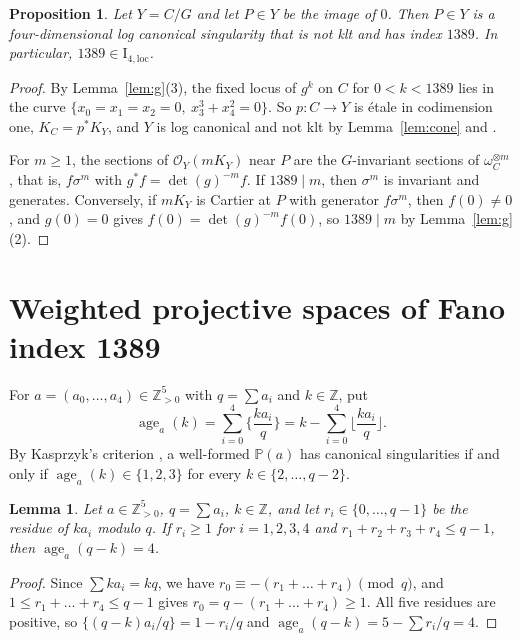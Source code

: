 \documentclass{amsart}
\newtheorem{lemma}[theorem]{Lemma}
\newtheorem{proposition}[theorem]{Proposition}
\theoremstyle{remark}
\DeclareMathOperator{\age}{age}
\newcommand{\Il}{\mathrm{I}_{4,\mathrm{loc}}}
\newcommand{\Z}{\mathbb{Z}}
\newcommand{\PP}{\mathbb{P}}
\begin{document}
\begin{proposition}\label{prop:loc}
Let $Y=C/G$ and let $P\in Y$ be the image of $0$. Then $P\in Y$ is a four-dimensional log canonical singularity that is not klt and has index $1389$. In particular, $1389\in\Il$.
\end{proposition}

\begin{proof}
By Lemma~\ref{lem:g}(3), the fixed locus of $g^k$ on $C$ for $0<k<1389$ lies in the curve $\{x_0=x_1=x_2=0,\ x_3^3+x_4^2=0\}$. So $p\colon C\to Y$ is \'etale in codimension one, $K_C=p^*K_Y$, and $Y$ is log canonical and not klt by Lemma~\ref{lem:cone} and \cite[5.20]{KM}.

For $m\geq1$, the sections of $\mathcal O_Y(mK_Y)$ near $P$ are the $G$-invariant sections of $\omega_C^{\otimes m}$, that is, $f\sigma^m$ with $g^*f=\det(g)^{-m}f$. If $1389\mid m$, then $\sigma^m$ is invariant and generates. Conversely, if $mK_Y$ is Cartier at $P$ with generator $f\sigma^m$, then $f(0)\neq0$, and $g(0)=0$ gives $f(0)=\det(g)^{-m}f(0)$, so $1389\mid m$ by Lemma~\ref{lem:g}(2).
\end{proof}

\section{Weighted projective spaces of Fano index 1389}\label{sec:wps}

For $a=(a_0,\dots,a_4)\in\Z_{>0}^5$ with $q=\sum a_i$ and $k\in\Z$, put
\[
\age_a(k)=\sum_{i=0}^4\Big\{\frac{ka_i}{q}\Big\}=k-\sum_{i=0}^4\Big\lfloor\frac{ka_i}{q}\Big\rfloor.
\]
By Kasprzyk's criterion \cite[Proposition~2.5]{Kas}, a well-formed $\PP(a)$ has canonical singularities if and only if $\age_a(k)\in\{1,2,3\}$ for every $k\in\{2,\dots,q-2\}$.

\begin{lemma}\label{lem:witness}
Let $a\in\Z_{>0}^5$, $q=\sum a_i$, $k\in\Z$, and let $r_i\in\{0,\dots,q-1\}$ be the residue of $ka_i$ modulo $q$. If $r_i\geq1$ for $i=1,2,3,4$ and $r_1+r_2+r_3+r_4\leq q-1$, then $\age_a(q-k)=4$.
\end{lemma}

\begin{proof}
Since $\sum ka_i=kq$, we have $r_0\equiv-(r_1+\dots+r_4)\pmod q$, and $1\leq r_1+\dots+r_4\leq q-1$ gives $r_0=q-(r_1+\dots+r_4)\geq1$. All five residues are positive, so $\{(q-k)a_i/q\}=1-r_i/q$ and $\age_a(q-k)=5-\sum r_i/q=4$.
\end{proof}
\end{document}
